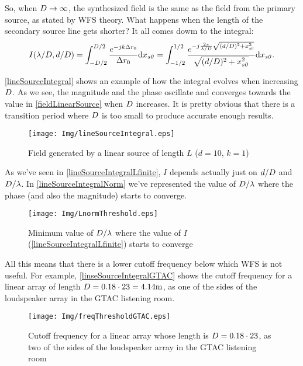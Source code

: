 So, when $\sectionTheoLength \to \infty$, the synthesized field is the same as the field from the primary source, as stated by WFS theory. What happens when the length of the secondary source line gets shorter? It all comes dowm to the integral:
\begin{equation}
I(\lambda/\sectionTheoLength, d/\sectionTheoLength) = \int_{-\sectionTheoLength/2}^{\sectionTheoLength/2} \frac{e^{-jk\distLinePoint}}{\distLinePoint} \mathrm{d}\PosTheo[section][x] = \int_{-1/2}^{1/2} \frac{e^{-j\frac{2\pi}{\lambda/\sectionTheoLength}\sqrt{(d/\sectionTheoLength)^2 + \PosTheo[section][x]^2}}}{\sqrt{(d/\sectionTheoLength)^2 + \PosTheo[section][x]^2}} \mathrm{d}\PosTheo[section][x].
\label{lineSourceIntegralLfinite}
\end{equation}

\autoref{lineSourceIntegral} shows an example of how the integral evolves when increasing $\sectionTheoLength$. As we see, the magnitude and the phase oscillate and converges towards the value in \autoref{fieldLinearSource} when $\sectionTheoLength$ increases. It is pretty obvious that there is a transition period where $\sectionTheoLength$ is too small to produce accurate enough results.

\begin{figure}[h]
	\centering
	\texttt{[image: Img/lineSourceIntegral.eps]}
	\caption{Field generated by a linear source of length $L$ ($d = 10$, $k = 1$)}
	\label{lineSourceIntegral}
\end{figure}

As we've seen in \autoref{lineSourceIntegralLfinite}, $I$ depends actually just on $d/\sectionTheoLength$ and $\sectionTheoLength/\lambda$. In \autoref{lineSourceIntegralNorm} we've represented the value of $\sectionTheoLength/\lambda$ where the phase (and also the magnitude) starts to converge.

\begin{figure}[h]
	\centering
	\texttt{[image: Img/LnormThreshold.eps]}
	\caption{Minimum value of $\sectionTheoLength/\lambda$ where the value of $I$ (\autoref{lineSourceIntegralLfinite}) starts to converge}
	\label{lineSourceIntegralNorm}
\end{figure}

All this means that there is a lower cutoff frequency below which WFS is not useful. For example, \autoref{linseSourceIntegralGTAC} shows the cutoff frequency for a linear array of length $\sectionTheoLength = 0.18\cdot23 = 4.14\si{m}$, as one of the sides of the loudspeaker array in the GTAC listening room.
\begin{figure}[h]
	\centering
	\texttt{[image: Img/freqThresholdGTAC.eps]}
	\caption[Cutoff frequency for a linear array whose length is $\sectionTheoLength = 0.18\cdot23$]{Cutoff frequency for a linear array whose length is $\sectionTheoLength = 0.18\cdot23$, as two of the sides of the loudspeaker array in the GTAC listening room}
	\label{linseSourceIntegralGTAC}
\end{figure}

